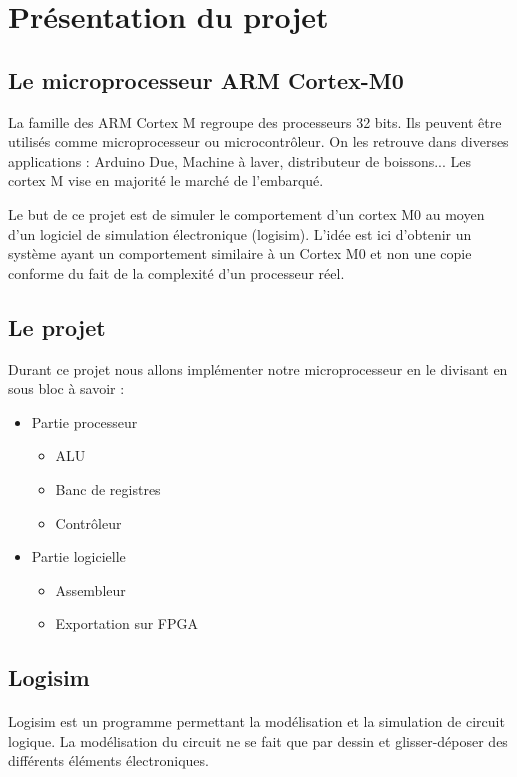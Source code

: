 \section{Présentation du projet}
\subsection{Le microprocesseur ARM Cortex-M0}
	La famille des ARM Cortex M regroupe des processeurs 32 bits. Ils peuvent être utilisés comme microprocesseur ou microcontrôleur. On les retrouve dans diverses applications : Arduino Due,  Machine à laver, distributeur de boissons...  Les cortex M vise en majorité le marché de l'embarqué.

	Le but de ce projet est de simuler le comportement d'un cortex M0 au moyen d'un logiciel de simulation électronique (logisim). L'idée est ici d'obtenir un système ayant un comportement similaire à un Cortex M0 et non une copie conforme du fait de la complexité d'un processeur réel.

\subsection{Le projet}
	Durant ce projet nous allons implémenter notre microprocesseur en le divisant en sous bloc à savoir :
\begin{itemize}
	\item Partie processeur
	\begin{itemize}
		\item ALU
		\item Banc de registres
		\item Contrôleur
	\end{itemize}
	\item Partie logicielle
	\begin{itemize}
		\item Assembleur
		\item Exportation sur FPGA
	\end{itemize}
\end{itemize}

\subsection{Logisim}

\paragraph{}
	Logisim est un programme permettant la modélisation et la simulation de circuit logique. La modélisation du circuit ne se fait que par dessin et glisser-déposer des différents éléments électroniques.
